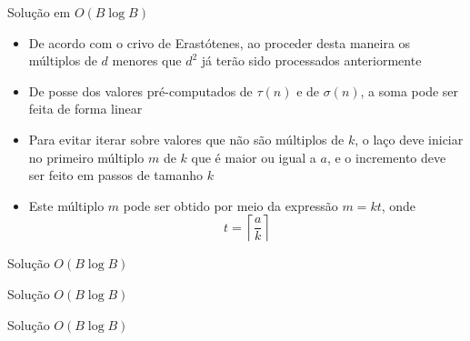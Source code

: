 \begin{frame}[fragile]{Solução em $O(B\log B)$}

    \begin{itemize}
        \item De acordo com o crivo de Erastótenes, ao proceder
            desta maneira os múltiplos de $d$ menores que $d^2$ já terão sido processados anteriormente

        \item De posse dos valores pré-computados de $\tau(n)$ e de $\sigma(n)$, a soma pode
            ser feita de forma linear 

        \item Para evitar iterar sobre valores que não são múltiplos de $k$, o laço deve iniciar
            no primeiro múltiplo $m$ de $k$ que é maior ou igual a $a$, e o incremento deve ser feito
            em passos de tamanho $k$

        \item Este múltiplo $m$ pode ser obtido por meio da expressão $m = kt$, onde
        $$
            t = \left\lceil \frac{a}{k} \right\rceil
        $$
    \end{itemize}

\end{frame}
\begin{frame}[fragile]{Solução $O(B\log B)$}
\end{frame}

\begin{frame}[fragile]{Solução $O(B\log B)$}
\end{frame}

\begin{frame}[fragile]{Solução $O(B\log B)$}
\end{frame}
